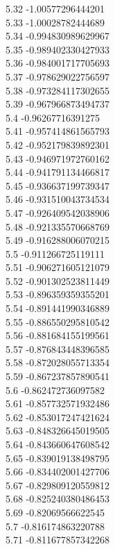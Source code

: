 {5.32	-1.00577296444201\\
5.33	-1.00028782444689\\
5.34	-0.994830989629967\\
5.35	-0.989402330427933\\
5.36	-0.984001717705693\\
5.37	-0.978629022756597\\
5.38	-0.973284117302655\\
5.39	-0.967966873494737\\
5.4	-0.96267716391275\\
5.41	-0.957414861565793\\
5.42	-0.952179839892301\\
5.43	-0.946971972760162\\
5.44	-0.941791134466817\\
5.45	-0.936637199739347\\
5.46	-0.931510043734534\\
5.47	-0.926409542038906\\
5.48	-0.921335570668769\\
5.49	-0.916288006070215\\
5.5	-0.911266725119111\\
5.51	-0.906271605121079\\
5.52	-0.901302523811449\\
5.53	-0.896359359355201\\
5.54	-0.891441990346889\\
5.55	-0.886550295810542\\
5.56	-0.881684155199561\\
5.57	-0.876843448396585\\
5.58	-0.872028055713354\\
5.59	-0.867237857890541\\
5.6	-0.862472736097582\\
5.61	-0.857732571932486\\
5.62	-0.853017247421624\\
5.63	-0.848326645019505\\
5.64	-0.843660647608542\\
5.65	-0.839019138498795\\
5.66	-0.834402001427706\\
5.67	-0.829809120559812\\
5.68	-0.825240380486453\\
5.69	-0.82069566622545\\
5.7	-0.816174863220788\\
5.71	-0.811677857342268\\
}
